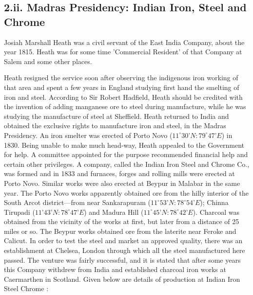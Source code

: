 \subsection*{2.ii.  Madras Presidency: Indian Iron, Steel and Chrome}

Josiah Marshall Heath was a civil servant of the East India Company, about the year 1815.  Heath was for some time 'Commercial Resident' of that Company at Salem and some other places.

Heath resigned the service soon after observing the indigenous iron working of that area and spent a few years in England studying first hand the smelting of iron and steel. According to Sir Robert Hadfield, Heath should be credited with the invention of adding manganese ore to steel during manufacture, while he was studying the manufacture of steel at Sheffield. Heath returned to India and obtained the exclusive rights to manufacture iron and steel, in the Madras Presidency. An iron smelter was erected of Porto Novo ($11^\circ 30’N:79^\circ 47’E$) in 1830. Being unable to make much head-way, Heath appealed to the Government for help. A committee appointed for the purpose recommended financial help and certain other privileges. A company, called the Indian Iron Steel and Chrome Co., was formed and in 1833 and furnaces, forges and rolling mills were erected at Porto Novo. Similar works were also erected at Beypur in Malabar in the same year. The Porto Novo works apparently obtained ore from the hilly interior of the South Arcot district—from near Sankarapuram ($11^\circ 53’N: 78^\circ 54’E$); Chinna Tirupadi ($11’ 43’N: 78^\circ 47’E$) and Madura Hill ($11^\circ 45’N: 78^\circ 42’E$). Charcoal was obtained from the vicinity of the works at first, but later from a distance of 25 miles or so. The Beypur works obtained ore from the laterite near Feroke and Calicut. In order to test the steel and market an approved quality, there was an establishment at Chelsea, London through which all the steel manufactured here passed. The venture was fairly successful, and it is stated that after some years this Company withdrew from India and established charcoal iron works at Caermarthen in Scotland. Given below are details of production at Indian Iron Steel Chrome :


